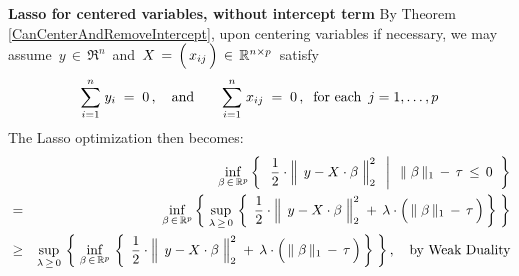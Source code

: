 \vskip 1.0cm
\noindent
\textbf{Lasso for centered variables, without intercept term}
\vskip 0.0cm
\noindent
By Theorem \ref{CanCenterAndRemoveIntercept}, upon centering variables if necessary,
we may assume \,$y \,\in\, \Re^{n}$\, and
\,$X \,=\, \left(\,\overset{{\color{white}-}}{x_{ij}}\,\right) \,\in\, \Re^{n \times p}$\,
satisfy
\begin{equation*}
\overset{n}{\underset{i=1}{\sum}}\;y_{i} \; = \; 0\,,
\quad\textnormal{and}\quad\quad
\overset{n}{\underset{i=1}{\sum}}\;x_{ij} \; = \; 0\,,
\;\;
\textnormal{for each \,$j = 1,\ldots,p$}
\end{equation*}
The Lasso optimization then becomes:
\begin{eqnarray*}
&&
	\underset{\beta\,\in\,\Re^{p}}{\inf}
	\left\{\;\;
		\left.
		\dfrac{1}{2}
		\cdot
		\left\Vert\;\, y \overset{{\color{white}.}}{-} X\cdot\beta \;\right\Vert_{2}^{2}
		\;\;\,\right\vert\;\;
		\Vert\;\beta\,\Vert_{1} \, - \, \tau \, \leq \, 0
		\;\;\right\}
\\
& = &
	\underset{\beta\,\in\,\Re^{p}}{\inf}
	\left\{\;
		\underset{\lambda\,\geq\,0}{\sup}\,
		\left\{\;\,
			\dfrac{1}{2}
			\cdot
			\left\Vert\;\, y \overset{{\color{white}.}}{-} X\cdot\beta \;\right\Vert_{2}^{2}
			\; + \,
			\lambda
			\cdot
			\left(\, \Vert\;\beta\,\Vert_{1} \, \overset{{\color{white}.}}{-} \, \tau \,\right)
			\,\right\}
		\;\right\}
\\
& \geq &
	\underset{\lambda\,\geq\,0}{\sup}\,
	\left\{\;
		\underset{\beta\,\in\,\Re^{p}}{\inf}\,
		\left\{\;\,
			\dfrac{1}{2}
			\cdot
			\left\Vert\;\, y \overset{{\color{white}.}}{-} X\cdot\beta \;\right\Vert_{2}^{2}
			\; + \,
			\lambda
			\cdot
			\left(\, \Vert\;\beta\,\Vert_{1} \, \overset{{\color{white}.}}{-} \, \tau \,\right)
			\,\right\}
		\;\right\},
	\quad
	\textnormal{by Weak Duality}
\end{eqnarray*}


